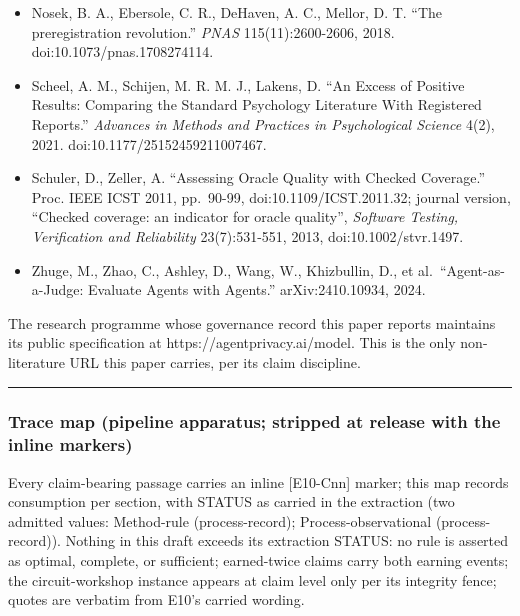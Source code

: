 \documentclass[
  11pt,
]{article}
\begin{document}
\begin{itemize}
  doi:10.1177/0956797614524255.
\item
  Nosek, B. A., Ebersole, C. R., DeHaven, A. C., Mellor, D. T. ``The
  preregistration revolution.'' \emph{PNAS} 115(11):2600-2606, 2018.
  doi:10.1073/pnas.1708274114.
\item
  Scheel, A. M., Schijen, M. R. M. J., Lakens, D. ``An Excess of
  Positive Results: Comparing the Standard Psychology Literature With
  Registered Reports.'' \emph{Advances in Methods and Practices in
  Psychological Science} 4(2), 2021. doi:10.1177/25152459211007467.
\item
  Schuler, D., Zeller, A. ``Assessing Oracle Quality with Checked
  Coverage.'' Proc. IEEE ICST 2011, pp.~90-99, doi:10.1109/ICST.2011.32;
  journal version, ``Checked coverage: an indicator for oracle
  quality'', \emph{Software Testing, Verification and Reliability}
  23(7):531-551, 2013, doi:10.1002/stvr.1497.
\item
  Zhuge, M., Zhao, C., Ashley, D., Wang, W., Khizbullin, D., et
  al.~``Agent-as-a-Judge: Evaluate Agents with Agents.''
  arXiv:2410.10934, 2024.
\end{itemize}

The research programme whose governance record this paper reports
maintains its public specification at https://agentprivacy.ai/model.
This is the only non-literature URL this paper carries, per its claim
discipline.

\begin{center}\rule{0.5\linewidth}{0.5pt}\end{center}

\subsubsection{Trace map (pipeline apparatus; stripped at release with
the inline
markers)}\label{trace-map-pipeline-apparatus-stripped-at-release-with-the-inline-markers}

Every claim-bearing passage carries an inline {[}E10-Cnn{]} marker; this
map records consumption per section, with STATUS as carried in the
extraction (two admitted values: Method-rule (process-record);
Process-observational (process-record)). Nothing in this draft exceeds
its extraction STATUS: no rule is asserted as optimal, complete, or
sufficient; earned-twice claims carry both earning events; the
circuit-workshop instance appears at claim level only per its integrity
fence; quotes are verbatim from E10's carried wording.
\end{document}
